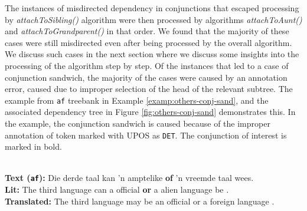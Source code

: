 The instances of misdirected dependency in conjunctions that escaped processing by \textit{attachToSibling()} algorithm were then processed by algorithms \textit{attachToAunt()} and \textit{attachToGrandparent()} in that order. We found that the majority of these cases were still misdirected even after being processed by the overall algorithm. We discuss such cases in the next section where we discuss some insights into the processing of the algorithm step by step. Of the instances that led to a case of conjunction sandwich, the majority of the cases were caused by an annotation error, caused due to improper selection of the head of the relevant subtree. The example from \verb|af| treebank in Example \ref{examp:others-conj-sand}, and the associated dependency tree in Figure \ref{fig:others-conj-sand} demonstrates this. In the example, the conjunction sandwich is caused because of the improper annotation of token marked with UPOS as \verb|DET|. The conjunction of interest is marked in bold.

\begin{example}
\label{examp:others-conj-sand}
\textbf{ }\\
\textbf{Text (\texttt{af}):} Die derde taal kan 'n amptelike \textbf{of} 'n vreemde taal wees.\\
\textbf{Lit:} The third language can a official \textbf{or} a alien language be .\\ 
\textbf{Translated:} The third language may be an official or a foreign language .
\end{example}

